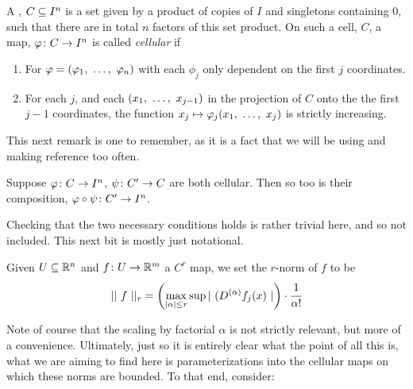 \begin{definition}
  A \emph{\bc}, $\CIn[C]{n}$ is a set given by a product of copies of $I$ and singletons containing $0$, such that there are in total $n$ factors of this set product. On such a cell, $C$, a \cont map, $\funcdom{\phi}{C}{I^n}$ is called \emph{cellular} if
    \begin{enumerate}
      \item For $\phi = (\vonevm{\phi}{n})$ with each $\phi_j$ only dependent on the first $j$ coordinates.

      \item For each $j$, and each $(\vonevm{x}{j - 1})$ in the projection of $C$ onto the the first $j - 1$ coordinates, the function $x_j \mapsto \phi_j(\vonevm{x}{j})$ is strictly increasing.
    \end{enumerate}

\end{definition}

This next remark is one to remember, as it is a fact that we will be using and making reference too often.



\begin{remark}
  Suppose $\funcdom{\phi}{C}{I^n}$, $\funcdom{\psi}{\pri{C}}{C}$ are both cellular. Then so too is their composition, $\funcdom{\phi \circ \psi}{\pri{C}}{I^n}$.
\end{remark}
Checking that the two necessary conditions holds is rather trivial here, and so not included. This next bit is mostly just notational.

\begin{definition}
  Given $\XRn[U]{n}$ and $\funcdom{f}{U}{\R^m}$ a $C^r$ map, we set the $r$-norm of $f$ to be
    \begin{align*}
      \rnorm[r]{\ f \ } = \left( \max_{\abs{\alpha} \leq r}{ \sup{ \abs{ \ ( D^{(\alpha)} f_j(x) \ } } } \right) \cdot \cfrac{1}{\alpha !}
    \end{align*}
\end{definition}

Note of course that the scaling by factorial $\alpha$ is not strictly relevant, but more of a convenience. Ultimately, just so it is entirely clear what the point of all this is, what we are aiming to find here is parameterizations into the cellular maps on which these norms are bounded. To that end, consider:


